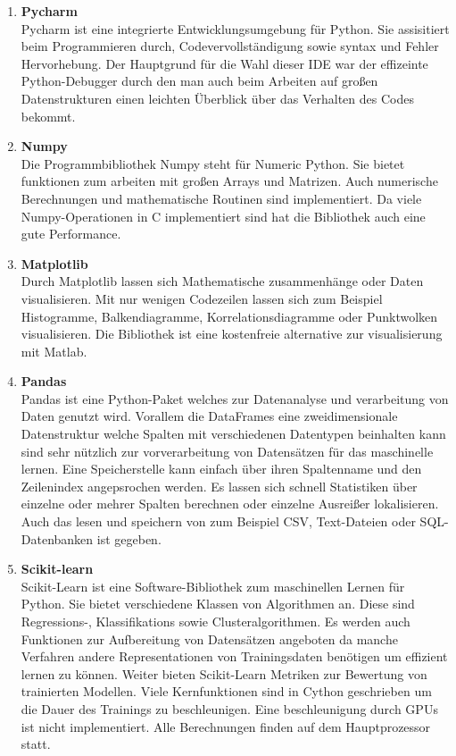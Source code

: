 \begin{enumerate}

\item[] \textbf{Pycharm}\hfill \\
Pycharm ist eine integrierte Entwicklungsumgebung f{\"u}r Python. 
Sie assisitiert beim Programmieren durch, Codevervollst{\"a}ndigung sowie syntax und Fehler Hervorhebung. Der Hauptgrund f{\"u}r die Wahl dieser IDE war der effizeinte Python-Debugger durch den man auch beim Arbeiten auf gro{\ss}en Datenstrukturen einen leichten {\"U}berblick {\"u}ber das Verhalten des Codes bekommt.


\item[] \textbf{Numpy}\hfill \\
Die Programmbibliothek Numpy steht f{\"u}r Numeric Python. Sie bietet funktionen zum arbeiten mit gro{\ss}en Arrays und Matrizen. Auch numerische Berechnungen und mathematische Routinen sind implementiert. Da viele Numpy-Operationen in C implementiert sind hat die Bibliothek auch eine gute Performance.


\item[] \textbf{Matplotlib}\hfill \\
Durch Matplotlib lassen sich Mathematische zusammenh{\"a}nge oder Daten visualisieren. 
Mit nur wenigen Codezeilen lassen sich zum Beispiel Histogramme, Balkendiagramme, Korrelationsdiagramme oder Punktwolken visualisieren. Die Bibliothek ist eine kostenfreie alternative zur visualisierung mit Matlab.


\item[] \textbf{Pandas}\hfill \\
Pandas ist eine Python-Paket welches zur Datenanalyse und verarbeitung von Daten genutzt wird.
Vorallem die DataFrames eine zweidimensionale Datenstruktur welche Spalten mit verschiedenen Datentypen beinhalten kann sind sehr n{\"u}tzlich zur vorverarbeitung von Datens{\"a}tzen f{\"u}r das maschinelle lernen. Eine Speicherstelle kann einfach {\"u}ber ihren Spaltenname und den Zeilenindex angepsrochen werden. Es lassen sich schnell Statistiken {\"u}ber einzelne oder mehrer Spalten berechnen oder einzelne Ausrei{\ss}er lokalisieren. Auch das lesen und speichern von zum Beispiel CSV, Text-Dateien oder SQL-Datenbanken ist gegeben.

\item[] \textbf{Scikit-learn}\hfill \\
Scikit-Learn ist eine Software-Bibliothek zum maschinellen Lernen f{\"u}r Python.
Sie bietet verschiedene Klassen von Algorithmen an. Diese sind Regressions-, Klassifikations sowie Clusteralgorithmen. Es werden auch Funktionen zur Aufbereitung von 
Datens{\"a}tzen angeboten da manche Verfahren andere Representationen von Trainingsdaten ben{\"o}tigen um effizient lernen zu k{\"o}nnen. Weiter bieten Scikit-Learn Metriken zur Bewertung von trainierten Modellen. Viele Kernfunktionen sind in Cython geschrieben um die Dauer des Trainings zu beschleunigen. Eine beschleunigung durch GPUs ist nicht implementiert. Alle Berechnungen finden auf dem Hauptprozessor statt.


\end{enumerate}
